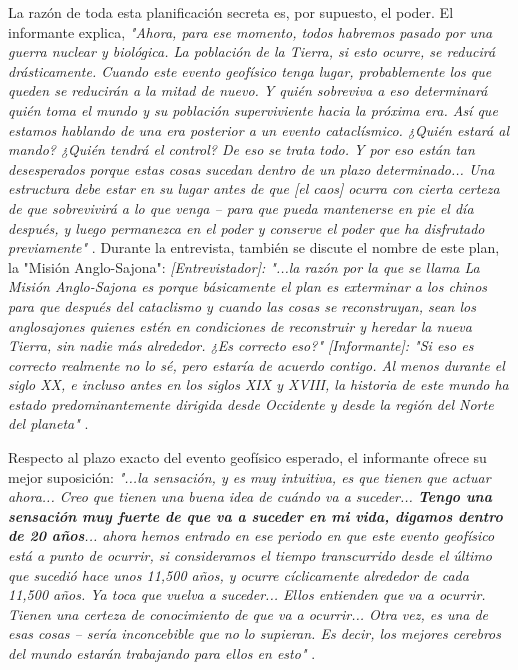 \documentclass[10pt,twocolumn,letterpaper]{article}
\begin{document}
La razón de toda esta planificación secreta es, por supuesto, el poder. El informante explica, \textit{"Ahora, para ese momento, todos habremos pasado por una guerra nuclear y biológica. La población de la Tierra, si esto ocurre, se reducirá drásticamente. Cuando este evento geofísico tenga lugar, probablemente los que queden se reducirán a la mitad de nuevo. Y quién sobreviva a eso determinará quién toma el mundo y su población superviviente hacia la próxima era. Así que estamos hablando de una era posterior a un evento cataclísmico. ¿Quién estará al mando? ¿Quién tendrá el control? De eso se trata todo. Y por eso están tan desesperados porque estas cosas sucedan dentro de un plazo determinado... Una estructura debe estar en su lugar antes de que [el caos] ocurra con cierta certeza de que sobrevivirá a lo que venga -- para que pueda mantenerse en pie el día después, y luego permanezca en el poder y conserve el poder que ha disfrutado previamente"} \cite{4}. Durante la entrevista, también se discute el nombre de este plan, la "Misión Anglo-Sajona": \textit{[Entrevistador]: "...la razón por la que se llama La Misión Anglo-Sajona es porque básicamente el plan es exterminar a los chinos para que después del cataclismo y cuando las cosas se reconstruyan, sean los anglosajones quienes estén en condiciones de reconstruir y heredar la nueva Tierra, sin nadie más alrededor. ¿Es correcto eso?" [Informante]: "Si eso es correcto realmente no lo sé, pero estaría de acuerdo contigo. Al menos durante el siglo XX, e incluso antes en los siglos XIX y XVIII, la historia de este mundo ha estado predominantemente dirigida desde Occidente y desde la región del Norte del planeta"} \cite{4}.

Respecto al plazo exacto del evento geofísico esperado, el informante ofrece su mejor suposición: \textit{"...la sensación, y es muy intuitiva, es que tienen que actuar ahora... Creo que tienen una buena idea de cuándo va a suceder... \textbf{Tengo una sensación muy fuerte de que va a suceder en mi vida, digamos dentro de 20 años}... ahora hemos entrado en ese periodo en que este evento geofísico está a punto de ocurrir, si consideramos el tiempo transcurrido desde el último que sucedió hace unos 11,500 años, y ocurre cíclicamente alrededor de cada 11,500 años. Ya toca que vuelva a suceder... Ellos entienden que va a ocurrir. Tienen una certeza de conocimiento de que va a ocurrir... Otra vez, es una de esas cosas -- sería inconcebible que no lo supieran. Es decir, los mejores cerebros del mundo estarán trabajando para ellos en esto"} \cite{4}.
\end{document}
